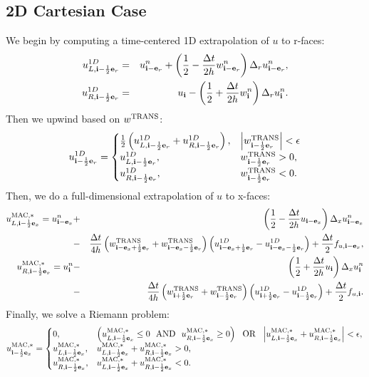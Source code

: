 \subsection{2D Cartesian Case}
We begin by computing a time-centered 1D extrapolation of $u$ to
r-faces:
\begin{eqnarray}
u_{L,{\bf i}-\frac{1}{2}{\bf e}_r}^{1D} &=& u_{{\bf i}-{\bf e}_r}^n + \left(\frac{1}{2} - \frac{\Delta t}{2h}w_{{\bf i}-{\bf e}_r}^n\right)\Delta_r u_{{\bf i}-{\bf e}_r}^n, \\
u_{R,{\bf i}-\frac{1}{2}{\bf e}_r}^{1D} &=& u_{{\bf i}} - \left(\frac{1}{2} + \frac{\Delta t}{2h}w_{{\bf i}}^n\right)\Delta_r u_{{\bf i}}^n.
\end{eqnarray}
Then we upwind based on $w^{\rm TRANS}$:
\begin{equation}
u_{{\bf i}-\frac{1}{2}{\bf e}_r}^{1D} =
\begin{cases}
\frac{1}{2}\left(u_{L,{\bf i}-\frac{1}{2}{\bf e}_r}^{1D} + u_{R,{\bf i}-\frac{1}{2}{\bf e}_r}^{1D}\right), & \left|w^{\rm TRANS}_{{\bf i}-\frac{1}{2}{\bf e}_r}\right| < \epsilon \\
u_{L,{\bf i}-\frac{1}{2}{\bf e}_r}^{1D}, & w^{\rm TRANS}_{{\bf i}-\frac{1}{2}{\bf e}_r} > 0, \\
u_{R,{\bf i}-\frac{1}{2}{\bf e}_r}^{1D}, & w^{\rm TRANS}_{{\bf i}-\frac{1}{2}{\bf e}_r} < 0. \\
\end{cases}
\end{equation}
Then, we do a full-dimensional extrapolation of $u$ to x-faces:
\begin{eqnarray}
u_{L,{\bf i}-\frac{1}{2}{\bf e}_x}^{\rm MAC,*} = u_{{\bf i}-{\bf e}_x}^n &+& \left(\frac{1}{2} - \frac{\Delta t}{2h}u_{{\bf i}-{\bf e}_x}\right)\Delta_x u_{{\bf i}-{\bf e}_x}^n \nonumber \\
&-& \frac{\Delta t}{4h}\left(w_{{\bf i}-{\bf e}_x+\frac{1}{2}{\bf e}_r}^{\rm TRANS}+w_{{\bf i}-{\bf e}_x-\frac{1}{2}{\bf e}_r}^{\rm TRANS}\right)\left(u_{{\bf i}-{\bf e}_x+\frac{1}{2}{\bf e}_r}^{1D} - u_{{\bf i}-{\bf e}_x-\frac{1}{2}{\bf e}_r}^{1D}\right) + \frac{\Delta t}{2}f_{u,{\bf i}-{\bf e}_x}, \\
u_{R,{\bf i}-\frac{1}{2}{\bf e}_x}^{\rm MAC,*} = u_{{\bf i}}^n &-& \left(\frac{1}{2} + \frac{\Delta t}{2h}u_{{\bf i}}\right)\Delta_x u_{{\bf i}}^n \nonumber \\
&-& \frac{\Delta t}{4h}\left(w_{{\bf i}+\frac{1}{2}{\bf e}_r}^{\rm TRANS}+w_{{\bf i}-\frac{1}{2}{\bf e}_r}^{\rm TRANS}\right)\left(u_{{\bf i}+\frac{1}{2}{\bf e}_r}^{1D} - u_{{\bf i}-\frac{1}{2}{\bf e}_r}^{1D}\right) + \frac{\Delta t}{2}f_{u,{\bf i}}.
\end{eqnarray}
Finally, we solve a Riemann problem:
\begin{equation}
u_{{\bf i}-\frac{1}{2}{\bf e}_x}^{\rm MAC,*} =
\begin{cases}
0, & \left(u_{L,{\bf i}-\frac{1}{2}{\bf e}_x}^{\rm MAC,*} \le 0 ~~ {\rm AND} ~~ u_{R,{\bf i}-\frac{1}{2}{\bf e}_x}^{\rm MAC,*} \ge 0\right) ~~ {\rm OR} ~~ \left|u_{L,{\bf i}-\frac{1}{2}{\bf e}_x}^{\rm MAC,*} + u_{R,{\bf i}-\frac{1}{2}{\bf e}_x}^{\rm MAC,*}\right| < \epsilon, \\
u_{L,{\bf i}-\frac{1}{2}{\bf e}_x}^{\rm MAC,*}, & u_{L,{\bf i}-\frac{1}{2}{\bf e}_x}^{\rm MAC,*} + u_{R,{\bf i}-\frac{1}{2}{\bf e}_x}^{\rm MAC,*} > 0, \\
u_{R,{\bf i}-\frac{1}{2}{\bf e}_x}^{\rm MAC,*}, & u_{L,{\bf i}-\frac{1}{2}{\bf e}_x}^{\rm MAC,*} + u_{R,{\bf i}-\frac{1}{2}{\bf e}_x}^{\rm MAC,*} < 0. 
\end{cases}
\end{equation}

